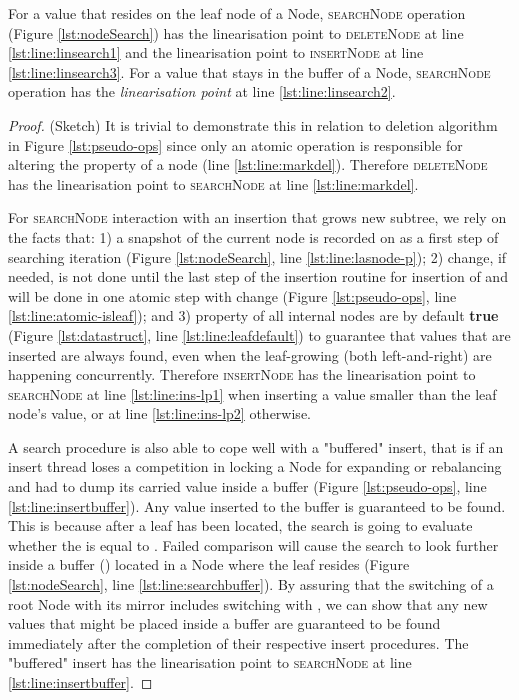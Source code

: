 \begin{lemma} 
For a value that resides on the leaf node of a Node,
\textsc{searchNode} operation (Figure \ref{lst:nodeSearch}) has the linearisation 
point to \textsc{deleteNode} at line \ref{lst:line:linsearch1} and the
linearisation point to \textsc{insertNode} at line \ref{lst:line:linsearch3}. 
For a value that stays in the buffer of a Node, \textsc{searchNode} 
operation has the \textit{linearisation point} at line \ref{lst:line:linsearch2}.
\label{lem:linear-search}
\end{lemma}
\begin{proof}(Sketch) It is trivial to demonstrate this in relation to
deletion algorithm in Figure \ref{lst:pseudo-ops} since only an atomic operation
is responsible for altering the  property of a node (line
\ref{lst:line:markdel}).
Therefore \textsc{deleteNode} has the linearisation point to \textsc{searchNode} 
at line \ref{lst:line:markdel}. 


For \textsc{searchNode} interaction with an insertion that grows new subtree, we
rely on the facts that: 1) a snapshot of the current node  is recorded on
 as a first step of searching iteration (Figure \ref{lst:nodeSearch},
line \ref{lst:line:lasnode-p}); 2)  change, if needed, is not done
until the last step of the insertion routine for insertion of 
and will be done in one atomic step with  change (Figure
\ref{lst:pseudo-ops}, line \ref{lst:line:atomic-isleaf}); and 3) 
property of all internal nodes are by default \textbf{true} (Figure
\ref{lst:datastruct}, line \ref{lst:line:leafdefault}) to guarantee that values
that are inserted are always found, even when the leaf-growing (both
left-and-right) are happening concurrently. Therefore
\textsc{insertNode} has the linearisation point to \textsc{searchNode} at line 
\ref{lst:line:ins-lp1} when inserting a value  smaller than the leaf node's 
value, or at line \ref{lst:line:ins-lp2} otherwise. 


A search procedure is also able to cope well with a "buffered" insert, that is
if an insert thread loses a competition in locking a Node for expanding
or rebalancing and had to dump its carried value inside a buffer (Figure
\ref{lst:pseudo-ops}, line \ref{lst:line:insertbuffer}). Any value inserted to
the buffer is guaranteed to be found. This is because after a leaf 
has been located, the search is going to evaluate whether the 
is equal to . Failed comparison will cause the search to look further inside
a buffer () located in a Node where the leaf resides
(Figure \ref{lst:nodeSearch}, line \ref{lst:line:searchbuffer}).
By assuring  that the switching of a root Node with its mirror includes
switching  with , we can show that any new
values that might be placed inside a buffer are guaranteed to be found
immediately after the completion of their respective insert procedures.
The "buffered" insert has the linearisation point to \textsc{searchNode} at
line \ref{lst:line:insertbuffer}.


\end{proof}
